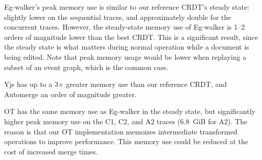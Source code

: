 \documentclass[sigplan,10pt]{acmart}
\newcommand{\algname}{Eg-walker\xspace}
\begin{document}
\algname's peak memory use is similar to our reference CRDT's steady state: slightly lower on the sequential traces, and approximately double for the concurrent traces.
However, the steady-state memory use of \algname is 1--2 orders of magnitude lower than the best CRDT.
This is a significant result, since the steady state is what matters during normal operation while a document is being edited.
Note that peak memory usage would be lower when replaying a subset of an event graph, which is the common case.


Yjs has up to a 3$\times$ greater memory use than our reference CRDT, and Automerge an order of magnitude greater.

OT has the same memory use as \algname in the steady state, but significantly higher peak memory use on the C1, C2, and A2 traces (6.8~GiB for A2).
The reason is that our OT implementation memoizes intermediate transformed operations to improve performance.
This memory use could be reduced at the cost of increased merge times.
\end{document}
